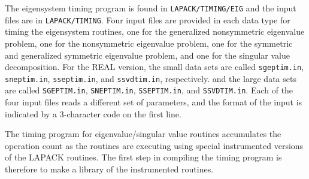 \dent
The eigensystem timing program is found in {\tt LAPACK/TIMING/EIG}
and the input files are in {\tt LAPACK/TIMING}.
Four input files are provided in each data type for timing the
eigensystem routines,
one for the generalized nonsymmetric eigenvalue problem, 
one for the nonsymmetric eigenvalue problem, 
one for the symmetric and generalized symmetric eigenvalue problem,
and one for the singular value decomposition.
For the REAL version, the small data sets are called {\tt sgeptim.in},
{\tt sneptim.in}, {\tt sseptim.in}, and {\tt ssvdtim.in}, respectively.
and the large data sets are called {\tt SGEPTIM.in}, {\tt SNEPTIM.in},
{\tt SSEPTIM.in}, and {\tt SSVDTIM.in}.
Each of the four input files reads a different set of parameters,
and the format of the input is indicated by a 3-character code
on the first line.

The timing program for eigenvalue/singular value routines accumulates
the operation count as the routines are executing using special
instrumented versions of the LAPACK routines.  The first step in
compiling the timing program is therefore to make a library of the
instrumented routines.

